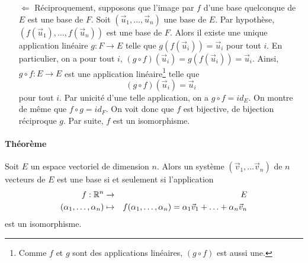 \begin{itemize}
  \item[$\Leftarrow$] Réciproquement, supposons que l'image par $f$ d'une base quelconque de $E$ est une base de $F$. Soit $(\vec{u}_1, \ldots, \vec{u}_n)$ une base de $E$. Par hypothèse, $(f(\vec{u}_1), \ldots, f(\vec{u}_n))$ est une base de $F$. Alors il existe une unique application linéaire $g: F \rightarrow E$ telle que $g(f(\vec{u}_i)) = \vec{u}_i$ pour tout $i$. En particulier, on a pour tout $i$, $(g \circ f)(\vec{u}_i) = g(f(\vec{u}_i)) = \vec{u}_i$. Ainsi, $g \circ f: E \rightarrow E$ est une application linéaire\footnote{Comme $f$ et $g$ sont des applications linéaires, $(g \circ f)$ est aussi une.} telle que
    $$(g \circ f)(\vec{u}_i) = \vec{u}_i$$
    pour tout $i$. Par unicité d'une telle application, on a $g \circ f = id_E$. On montre de même que $f \circ g = id_F$. On voit donc que $f$ est bijective, de bijection réciproque $g$. Par suite, $f$ est un isomorphisme.
\end{itemize}

\paragraph{Théorème} Soit $E$ un espace vectoriel de dimension $n$. Alors un système $(\vec{v}_1, \ldots \vec{v}_n)$ de $n$ vecteurs de $E$ est une base si et seulement si l'application
\begin{eqnarray*}
  f: \mathbb{R}^n &\rightarrow& E \\
  (\alpha_1, \ldots, \alpha_n) &\mapsto& f(\alpha_1, \ldots, \alpha_n) = \alpha_1 \vec{v}_1 + \ldots + \alpha_n \vec{v}_n
\end{eqnarray*}
est un isomorphisme.

